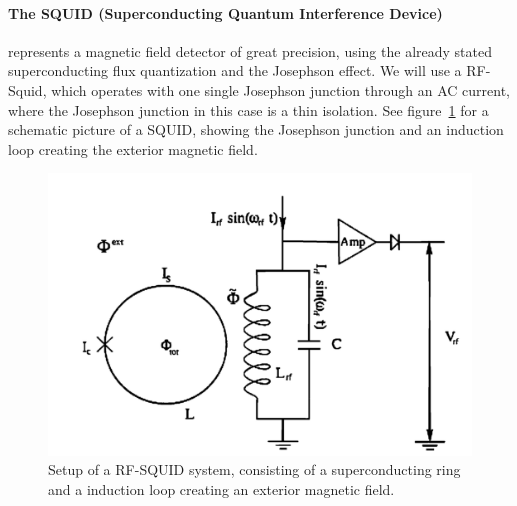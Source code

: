 \paragraph{The SQUID (Superconducting Quantum Interference Device)} represents a magnetic field
detector of great precision, using the already stated superconducting flux quantization and
the Josephson effect. We will use a RF-Squid, which operates with one single Josephson junction%
through an AC current, where the Josephson junction in this case is a thin isolation. 
See figure~\ref{fig:squid1} for a schematic picture of a SQUID, showing the Josephson junction and 
an induction loop creating the exterior magnetic field.
\begin{figure}[H]
    \centering
    \includegraphics[width=1\linewidth]{figures/squid1}
    \caption{Setup of a RF-SQUID system, consisting of a superconducting ring and a induction loop creating
        an exterior magnetic field.}
    \label{fig:squid1}
\end{figure}



